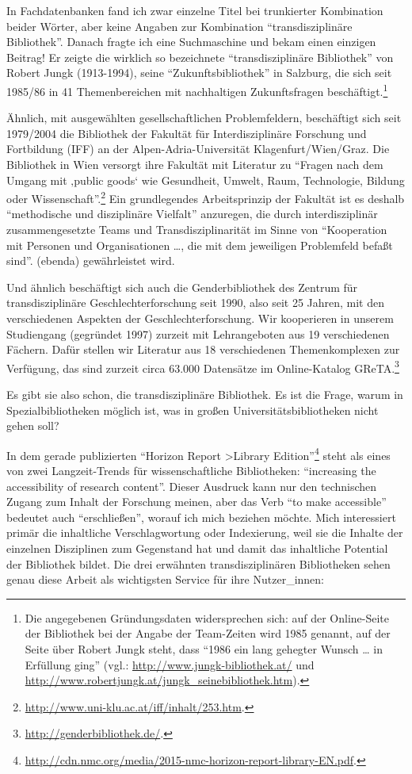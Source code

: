 In Fachdatenbanken fand ich zwar einzelne Titel bei trunkierter
Kombination beider Wörter, aber keine Angaben zur Kombination
\enquote{transdisziplinäre Bibliothek}. Danach fragte ich eine
Suchmaschine und bekam einen einzigen Beitrag! Er zeigte die wirklich so
bezeichnete \enquote{transdisziplinäre Bibliothek} von Robert Jungk
(1913-1994), seine \enquote{Zukunftsbibliothek} in Salzburg, die sich
seit 1985/86 in 41 Themenbereichen mit nachhaltigen Zukunftsfragen
beschäftigt.\footnote{Die angegebenen Gründungsdaten widersprechen sich:
  auf der Online-Seite der Bibliothek bei der Angabe der Team-Zeiten
  wird 1985 genannt, auf der Seite über Robert Jungk steht, dass
  \enquote{1986 ein lang gehegter Wunsch \ldots{} in Erfüllung ging}
  (vgl.: \url{http://www.jungk-bibliothek.at/} und
  \url{http://www.robertjungk.at/jungk_seinebibliothek.htm}).}

Ähnlich, mit ausgewählten gesellschaftlichen Problemfeldern, beschäftigt
sich seit 1979/2004 die Bibliothek der Fakultät für Interdisziplinäre
Forschung und Fortbildung (IFF) an der Alpen-Adria-Universität
Klagenfurt/Wien/Graz. Die Bibliothek in Wien versorgt ihre Fakultät mit
Literatur zu \enquote{Fragen nach dem Umgang mit ‚public goods` wie
Gesundheit, Umwelt, Raum, Technologie, Bildung oder
Wissenschaft}.\footnote{\url{http://www.uni-klu.ac.at/iff/inhalt/253.htm}.}
Ein grundlegendes Arbeitsprinzip der Fakultät ist es deshalb
\enquote{methodische und disziplinäre Vielfalt} anzuregen, die durch
interdisziplinär zusammengesetzte Teams und Transdisziplinarität im
Sinne von \enquote{Kooperation mit Personen und Organisationen \ldots{},
die mit dem jeweiligen Problemfeld befaßt sind}. (ebenda) gewährleistet
wird.

Und ähnlich beschäftigt sich auch die Genderbibliothek des Zentrum für
transdisziplinäre Geschlechterforschung seit 1990, also seit 25 Jahren,
mit den verschiedenen Aspekten der Geschlechterforschung. Wir
kooperieren in unserem Studiengang (gegründet 1997) zurzeit mit
Lehrangeboten aus 19 verschiedenen Fächern. Dafür stellen wir Literatur
aus 18 verschiedenen Themenkomplexen zur Verfügung, das sind zurzeit
circa 63.000 Datensätze im Online-Katalog GReTA.\footnote{\url{http://genderbibliothek.de/}.}

Es gibt sie also schon, die transdisziplinäre Bibliothek. Es ist die
Frage, warum in Spezialbibliotheken möglich ist, was in großen
Universitätsbibliotheken nicht gehen soll?

In dem gerade publizierten \enquote{Horizon Report \textgreater{}Library
Edition}\footnote{\url{http://cdn.nmc.org/media/2015-nmc-horizon-report-library-EN.pdf}.}
steht als eines von zwei Langzeit-Trends für wissenschaftliche
Bibliotheken: \enquote{increasing the accessibility of research
content}. Dieser Ausdruck kann nur den technischen Zugang zum Inhalt der
Forschung meinen, aber das Verb \enquote{to make accessible} bedeutet
auch \enquote{erschließen}, worauf ich mich beziehen möchte. Mich
interessiert primär die inhaltliche Verschlagwortung oder Indexierung,
weil sie die Inhalte der einzelnen Disziplinen zum Gegenstand hat und
damit das inhaltliche Potential der Bibliothek bildet. Die drei
erwähnten transdisziplinären Bibliotheken sehen genau diese Arbeit als
wichtigsten Service für ihre Nutzer\_innen:

